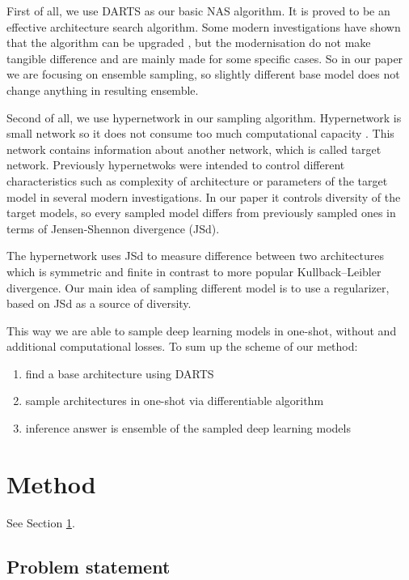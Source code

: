 \documentclass{article}
\begin{document}
First of all, we use DARTS \citep{darts} as our basic NAS algorithm. It is proved to be an effective architecture search algorithm. Some
modern investigations have shown that the algorithm can be upgraded \citep{p-darts, sdarts, darts-}, but the modernisation do not make tangible difference
and are mainly made for some specific cases. So in our paper we are focusing on ensemble sampling, so slightly different base
model does not change anything in resulting ensemble.

Second of all, we use hypernetwork in our sampling algorithm. Hypernetwork is small network so it does not
consume too much computational capacity \citep{hypernetworks}. This network contains information about another network, which is called target network.
Previously hypernetwoks were intended to control different characteristics such as
complexity of architecture \citep{darts-cc} or parameters of the target model \citep{cont-learn} in several modern investigations. In our paper it controls 
diversity of the target models, so every sampled model differs from previously sampled ones in terms of Jensen-Shennon divergence (JSd).

The hypernetwork uses JSd to measure difference between two architectures which is symmetric and finite
in contrast to more popular Kullback–Leibler divergence. Our main idea of sampling different model is to use a regularizer,
based on JSd as a source of diversity.

This way we are able to sample deep learning models in one-shot, without and additional computational losses.
To sum up the scheme of our method:
\begin{enumerate} 
    \item find a base architecture using DARTS
    \item sample architectures in one-shot via differentiable algorithm
    \item inference answer is ensemble of the sampled deep learning models
\end{enumerate}


\section{Method}
\label{sec:headings}

See Section \ref{sec:headings}.

\subsection{Problem statement}
\end{document}
